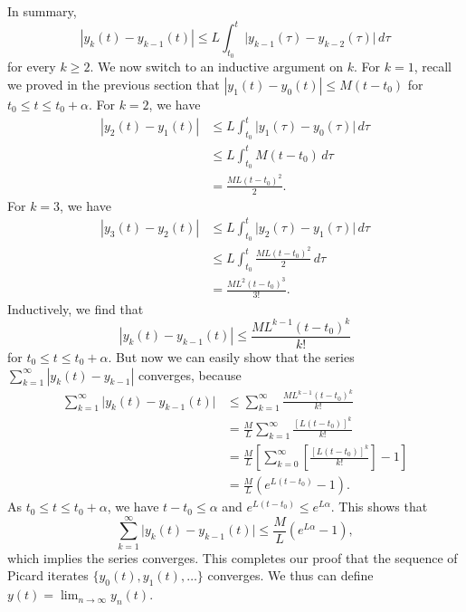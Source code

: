 \documentclass{myart}
\begin{document}
In summary,
\begin{equation*}
|y_k(t) - y_{k-1}(t)| \leq L \int_{t_0}^t \Big|y_{k-1}(\tau) - y_{k-2}(\tau)\Big| \,d\tau
\end{equation*}
for every $k \geq 2$. We now switch to an inductive argument on $k$. For $k = 1$, recall we proved in the previous section that $|y_1(t) - y_0(t)| \leq M(t - t_0)$ for $t_0 \leq t \leq t_0 + \alpha$. For $k = 2$, we have
\begin{align*}
|y_2(t) - y_1(t)| &\leq L \int_{t_0}^t \Big|y_1(\tau) - y_0(\tau)\Big| \,d\tau \\
&\leq L \int_{t_0}^t M(t - t_0) \,d\tau \\
&= \frac{ML(t - t_0)^2}{2}.
\end{align*}
For $k = 3$, we have
\begin{align*}
|y_3(t) - y_2(t)| &\leq L \int_{t_0}^t \Big|y_2(\tau) - y_1(\tau)\Big| \,d\tau \\
&\leq L \int_{t_0}^t \frac{ML(t - t_0)^2}{2} \,d\tau \\
&= \frac{ML^2(t - t_0)^3}{3!}.
\end{align*}
Inductively, we find that
\begin{equation} \label{eq:bound}
|y_k(t) - y_{k-1}(t)| \leq \frac{ML^{k-1}(t - t_0)^k}{k!}
\end{equation}
for $t_0 \leq t \leq t_0 + \alpha$. But now we can easily show that the series $\sum_{k=1}^\infty |y_k(t) - y_{k-1}|$ converges, because
\begin{align*}
\sum_{k=1}^\infty \Big|y_k(t) - y_{k-1}(t)\Big| &\leq \sum_{k=1}^\infty \frac{ML^{k-1}(t - t_0)^k}{k!} \\
&= \frac{M}{L} \sum_{k=1}^\infty \frac{[L(t - t_0)]^k}{k!} \\
&= \frac{M}{L} \left[\sum_{k=0}^\infty \left[\frac{[L(t - t_0)]^k}{k!}\right] - 1\right] \\
&= \frac{M}{L} \left(e^{L(t - t_0)} - 1\right).
\end{align*}
As $t_0 \leq t \leq t_0 + \alpha$, we have $t - t_0 \leq \alpha$ and $e^{L(t - t_0)} \leq e^{L\alpha}$. This shows that
\begin{equation*}
\sum_{k=1}^\infty \Big|y_k(t) - y_{k-1}(t)\Big| \leq \frac{M}{L} \left(e^{L\alpha} - 1\right),
\end{equation*}
which implies the series converges. This completes our proof that the sequence of Picard iterates $\{y_0(t), y_1(t), \ldots\}$ converges. We thus can define $y(t) = \lim_{n \to \infty} y_n(t)$.
\end{document}

